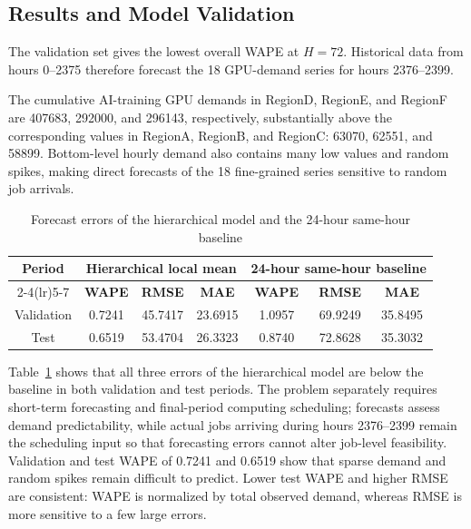 \subsection{Results and Model Validation}

The validation set gives the lowest overall WAPE at $H=72$. Historical data from hours 0--2375 therefore forecast the 18 GPU-demand series for hours 2376--2399.

The cumulative AI-training GPU demands in RegionD, RegionE, and RegionF are
407683, 292000, and 296143, respectively,
substantially above the corresponding values in RegionA, RegionB, and RegionC:
63070, 62551, and 58899.
Bottom-level hourly demand also contains many low values and random spikes,
making direct forecasts of the 18 fine-grained series sensitive to random job arrivals.

\begin{table}[H]
	\centering
    \caption{Forecast errors of the hierarchical model and the 24-hour same-hour baseline}
	\label{tab:q1_forecast}
	
	\fontsize{10.5pt}{12pt}\selectfont
	\renewcommand{\arraystretch}{0.88}
	
	\begin{tabular}{ccccccc}
		\toprule
        \multirow{2}{*}{\textbf{Period}}
        & \multicolumn{3}{c}{\textbf{Hierarchical local mean}}
        & \multicolumn{3}{c}{\textbf{24-hour same-hour baseline}}\\
		\cmidrule(lr){2-4}\cmidrule(lr){5-7}
		& \textbf{WAPE} & \textbf{RMSE} & \textbf{MAE}
		& \textbf{WAPE} & \textbf{RMSE} & \textbf{MAE}\\
		\midrule
        Validation
		& 0.7241 & 45.7417 & 23.6915
		& 1.0957 & 69.9249 & 35.8495\\
		
        Test
		& 0.6519 & 53.4704 & 26.3323
		& 0.8740 & 72.8628 & 35.3032\\
		\bottomrule
	\end{tabular}
\end{table}


Table~\ref{tab:q1_forecast} shows that all three errors of the hierarchical model are below the baseline in both validation and test periods. The problem separately requires short-term forecasting and final-period computing scheduling; forecasts assess demand predictability, while actual jobs arriving during hours 2376--2399 remain the scheduling input so that forecasting errors cannot alter job-level feasibility. Validation and test WAPE of 0.7241 and 0.6519 show that sparse demand and random spikes remain difficult to predict. Lower test WAPE and higher RMSE are consistent: WAPE is normalized by total observed demand, whereas RMSE is more sensitive to a few large errors.


